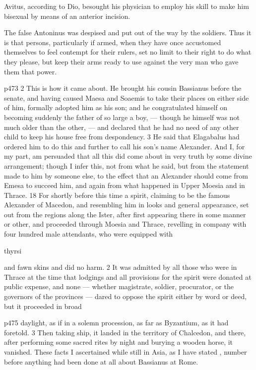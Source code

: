 Avitus, according to Dio, besought his physician to employ his skill to make him bisexual by means of an anterior incision.

The false Antoninus was despised and put out of the way by the soldiers. Thus it is that persons, particularly if armed, when they have once accustomed themselves to feel contempt for their rulers, set no limit to their right to do what they please, but keep their arms ready to use against the very man who gave them that power.

p473
2
This is how it came about. He brought his cousin Bassianus before the senate, and having caused Maesa and Soaemis to take their places on either side of him, formally adopted him as his son; and he congratulated himself on becoming suddenly the father of so large a boy, \texthebrew{—} though he himself was not much older than the other, \texthebrew{—} and declared that he had no need of any other child to keep his house free from despondency. 3 He said that Elagabalus had ordered him to do this and further to call his son's name Alexander. And I, for my part, am persuaded that all this did come about in very truth by some divine arrangement; though I infer this, not from what he said, but from the statement made to him by someone else, to the effect that an Alexander should come from Emesa to succeed him, and again from what happened in Upper Moesia and in Thrace. 18 For shortly before this time a spirit, claiming to be the famous Alexander of Macedon, and resembling him in looks and general appearance, set out from the regions along the Ister, after first appearing there in some manner or other, and proceeded through Moesia and Thrace, revelling in company with four hundred male attendants, who were equipped with

thyrsi

and fawn skins and did no harm. 2 It was admitted by all those who were in Thrace at the time that lodgings and all provisions for the spirit were donated at public expense, and none \texthebrew{—} whether magistrate, soldier, procurator, or the governors of the provinces \texthebrew{—} dared to oppose the spirit either by word or deed, but it proceeded in broad

p475 daylight, as if in a solemn procession, as far as Byzantium, as it had foretold. 3 Then taking ship, it landed in the territory of Chalcedon, and there, after performing some sacred rites by night and burying a wooden horse, it vanished. These facts I ascertained while still in Asia, as I have stated , number before anything had been done at all about Bassianus at Rome.


